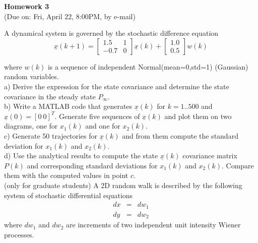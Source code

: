 \documentclass{article}
\begin{document}
 
\begin{center}
{\bf \Large  Homework 3} \\
(Due on: Fri, April 22, 8:00PM, by e-mail)
\end{center}


 A dynamical system is governed by the stochastic difference equation 
\begin{equation}
  \underline{x}(k+1)=\left[
  \begin{array}{cc} 
    1.5 & 1 \\
   -0.7 & 0
  \end{array}
  \right] \underline{x}(k)+
  \left[ 
  \begin{array}{c}
   1.0 \\
   0.5 
  \end{array}
\right] w(k)
\end{equation}

\noindent where $w(k)$ is a sequence of independent Normal(mean=0,std=1) (Gaussian)
random variables. \\

\noindent a) Derive the expression for the state covariance and determine the state covariance in the steady state $P_{\infty}$. \\

\noindent b) Write a MATLAB code that generates $\underline{x}(k)$ for $k = 1..500$ and 
$\underline{x}(0) = [0\ 0]^T$. Generate five sequences of $\underline{x}(k)$ and plot them on two 
diagrams, one for $x_1(k)$ and one for $x_2(k)$.  \\

\noindent c) Generate 50 trajectories for $\underline{x}(k)$ and from them compute the 
standard deviation for $x_1(k)$ and $x_2(k)$. \\

\noindent d) Use the analytical results to compute the state $\underline{x}(k)$ covariance 
matrix $P(k)$ and corresponding standard deviations for $x_1(k)$ and $x_2(k)$. 
Compare them with the computed values  in point $c$. \\

 (only for graduate students) A 2D random walk is described by the following system of 
stochastic differential equations
\begin{eqnarray}
  dx&=&dw_1 \\
  dy&=&dw_2
\end{eqnarray}
where $dw_1$ and $dw_2$ are increments of two independent unit intensity Wiener processes. \\
 
\end{document}
